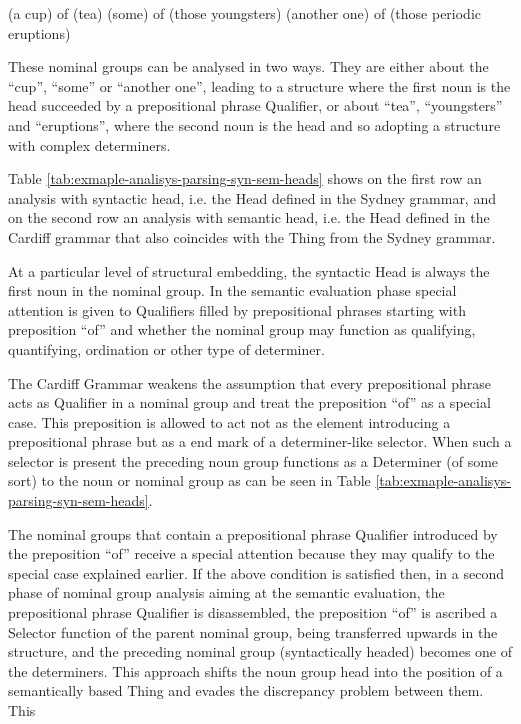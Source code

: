 \begin{exe}
    \ex \label{ex:dectic-ngs} (a cup) of (tea)
    \ex \label{ex:dectic-ngs1}(some) of (those youngsters)
    \ex \label{ex:dectic-ngs2}(another one) of (those periodic eruptions)
\end{exe}

These nominal groups can be analysed in two ways. They are either about the ``cup'', ``some'' or ``another one'', leading to a structure where the first noun is the head succeeded by a prepositional phrase Qualifier, or about ``tea'', ``youngsters'' and ``eruptions'', where the second noun is the head and so adopting a structure with complex determiners.

Table \ref{tab:exmaple-analisys-parsing-syn-sem-heads} shows on the first row an analysis with syntactic head, i.e. the Head defined in the Sydney grammar, and on the second row an analysis with semantic head, i.e. the Head defined in the Cardiff grammar that also coincides with the Thing from the Sydney grammar.

At a particular level of structural embedding, the syntactic Head is always the first noun in the nominal group. In the semantic evaluation phase special attention is given to Qualifiers filled by prepositional phrases starting with preposition ``of'' and whether the nominal group may function as qualifying, quantifying, ordination or other type of determiner. 

The Cardiff Grammar weakens the assumption that every prepositional phrase acts as Qualifier in a nominal group and treat the preposition ``of'' as a special case. This preposition is allowed to act not as the element introducing a prepositional phrase but as a end mark of a determiner-like selector. When such a selector is present the preceding noun group functions as a Determiner (of some sort) to the noun or nominal group as can be seen in Table \ref{tab:exmaple-analisys-parsing-syn-sem-heads}. 

The nominal groups that contain a prepositional phrase Qualifier introduced by the preposition ``of'' receive a special attention because they may qualify to the special case explained earlier. If the above condition is satisfied then, in a second phase of nominal group analysis aiming at the semantic evaluation, the prepositional phrase Qualifier is disassembled, the preposition ``of'' is ascribed a Selector function of the parent nominal group, being transferred upwards in the structure, and the preceding nominal group (syntactically headed) becomes one of the determiners. This approach shifts the noun group head into the position of a semantically based Thing and evades the discrepancy problem between them. This 

